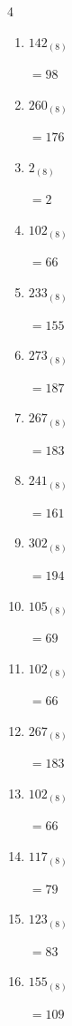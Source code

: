 \begin{multicols}{4}
\begin{enumerate}
\columnbreak %

  \item $142_{(8)}$

        $=98$

  \item $260_{(8)}$

        $=176$

  \item $2_{(8)}$

        $=2$

  \item $102_{(8)}$

        $=66$

  \item $233_{(8)}$

        $=155$

  \item $273_{(8)}$

        $=187$

  \item $267_{(8)}$

        $=183$

  \item $241_{(8)}$

        $=161$

  \item $302_{(8)}$

        $=194$

  \item $105_{(8)}$

        $=69$

  \item $102_{(8)}$

        $=66$

  \item $267_{(8)}$

        $=183$

  \item $102_{(8)}$

        $=66$

  \item $117_{(8)}$

        $=79$

  \item $123_{(8)}$

        $=83$

\columnbreak %

  \item $155_{(8)}$

        $=109$


\end{enumerate}
\end{multicols}
